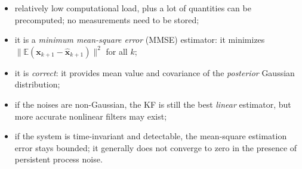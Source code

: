 \documentclass[11pt,a4paper]{article}
\newcommand{\hx}{\hat{\boldsymbol{x}}}
\newcommand{\bx}{\boldsymbol{x}}
\newcommand{\E}{\mathbb{E}}
\theoremstyle{plain}
\theoremstyle{definition}
\theoremstyle{remark}
\begin{document}
\begin{itemize}
\item relatively low computational load, plus a lot of quantities can be precomputed; no measurements need to be stored;
\item it is a \emph{minimum mean-square error} (MMSE) estimator: it minimizes $\|\E(\bx_{k+1}-\hx_{k+1})\|^2$ for all $k$;
\item it is \emph{correct}: it provides mean value and covariance of the \emph{posterior} Gaussian distribution;
\item if the noises are non-Gaussian, the KF is still the best \emph{linear} estimator, but more accurate nonlinear filters may exist;
\item if the system is time-invariant and detectable, the mean-square estimation error stays bounded; it generally does not converge
to zero in the presence of persistent process noise.
\end{itemize}
\end{document}
